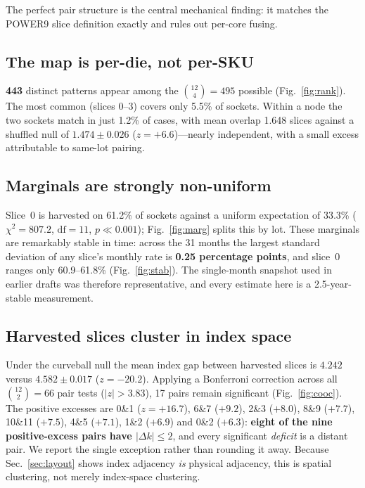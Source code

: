 \documentclass[10pt,conference]{IEEEtran}
\begin{document}
The perfect pair structure is the central mechanical finding: it matches the POWER9 slice
definition exactly and rules out per-core fusing.

\subsection{The map is per-die, not per-SKU}
\textbf{443} distinct patterns appear among the $\binom{12}{4}=495$ possible
(Fig.~\ref{fig:rank}). The most common (slices 0--3) covers only 5.5\% of sockets. Within a node the two sockets match in just
1.2\% of cases, with mean overlap 1.648 slices against a shuffled null of $1.474\pm0.026$
($z=+6.6$)---nearly independent, with a small excess attributable to same-lot pairing.

\subsection{Marginals are strongly non-uniform}
Slice~0 is harvested on 61.2\% of sockets against a uniform expectation of 33.3\%
($\chi^2=807.2$, $\mathrm{df}=11$, $p\ll0.001$); Fig.~\ref{fig:marg} splits this by lot. These
marginals are remarkably stable in time: across the 31 months the largest standard deviation of any
slice's monthly rate is \textbf{0.25 percentage points}, and slice~0 ranges only 60.9--61.8\%
(Fig.~\ref{fig:stab}). The single-month snapshot used in earlier drafts was therefore
representative, and every estimate here is a 2.5-year-stable measurement.

\subsection{Harvested slices cluster in index space}
\label{sec:cluster}
Under the curveball null the mean index gap between harvested slices is $4.242$ versus
$4.582\pm0.017$ ($z=-20.2$). Applying a Bonferroni correction across all $\binom{12}{2}=66$ pair
tests ($|z|>3.83$), 17 pairs remain significant (Fig.~\ref{fig:cooc}). The positive excesses are
0\&1 ($z=+16.7$), 6\&7 ($+9.2$), 2\&3 ($+8.0$), 8\&9 ($+7.7$), 10\&11 ($+7.5$), 4\&5 ($+7.1$),
1\&2 ($+6.9$) and 0\&2 ($+6.3$): \textbf{eight of the nine positive-excess pairs have
$|\Delta k|\le2$}, and every significant \emph{deficit} is a distant pair. We report the single
exception rather than rounding it away. Because Sec.~\ref{sec:layout} shows index adjacency
\emph{is} physical adjacency, this is spatial clustering, not merely index-space clustering.
\end{document}
